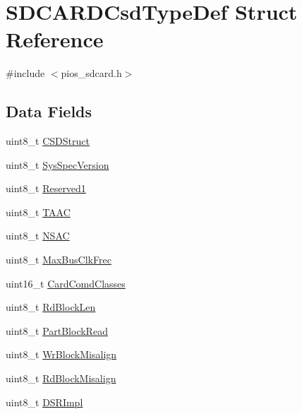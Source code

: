 \hypertarget{struct_s_d_c_a_r_d_csd_type_def}{\section{\-S\-D\-C\-A\-R\-D\-Csd\-Type\-Def \-Struct \-Reference}
\label{struct_s_d_c_a_r_d_csd_type_def}
}


{\ttfamily \#include $<$pios\-\_\-sdcard.\-h$>$}

\subsection*{\-Data \-Fields}
\begin{DoxyCompactItemize}
\item 
uint8\-\_\-t \hyperlink{group___p_i_o_s___s_d_c_a_r_d_ga49354de313b96595043a78940055d651}{\-C\-S\-D\-Struct}
\item 
uint8\-\_\-t \hyperlink{group___p_i_o_s___s_d_c_a_r_d_ga68ba16a5f115dc00b88d70d6912a1c45}{\-Sys\-Spec\-Version}
\item 
uint8\-\_\-t \hyperlink{group___p_i_o_s___s_d_c_a_r_d_ga8d15c8c3b9e293b1b62efea47010180d}{\-Reserved1}
\item 
uint8\-\_\-t \hyperlink{group___p_i_o_s___s_d_c_a_r_d_gaec29af38b2fc16f147533e11c61e2787}{\-T\-A\-A\-C}
\item 
uint8\-\_\-t \hyperlink{group___p_i_o_s___s_d_c_a_r_d_ga8573c74ea99da2cfb8f4848fa4350491}{\-N\-S\-A\-C}
\item 
uint8\-\_\-t \hyperlink{group___p_i_o_s___s_d_c_a_r_d_ga9413a0371dfa0c4bf305c922b10392f1}{\-Max\-Bus\-Clk\-Frec}
\item 
uint16\-\_\-t \hyperlink{group___p_i_o_s___s_d_c_a_r_d_ga6684006d87c1e8fda9008685fd83698b}{\-Card\-Comd\-Classes}
\item 
uint8\-\_\-t \hyperlink{group___p_i_o_s___s_d_c_a_r_d_gab4a98c4b27e0e4cbb4ace4d6ff93c056}{\-Rd\-Block\-Len}
\item 
uint8\-\_\-t \hyperlink{group___p_i_o_s___s_d_c_a_r_d_gab165bf6b064166e0bf54f2a6c7d85a9a}{\-Part\-Block\-Read}
\item 
uint8\-\_\-t \hyperlink{group___p_i_o_s___s_d_c_a_r_d_gac79fcdd1037496c353ac1570fb9a58a5}{\-Wr\-Block\-Misalign}
\item 
uint8\-\_\-t \hyperlink{group___p_i_o_s___s_d_c_a_r_d_ga959156fe53645cd48d715f89c3407618}{\-Rd\-Block\-Misalign}
\item 
uint8\-\_\-t \hyperlink{group___p_i_o_s___s_d_c_a_r_d_ga650841d99b60792a21a853a6a2c541d9}{\-D\-S\-R\-Impl}

\end{DoxyCompactItemize}

